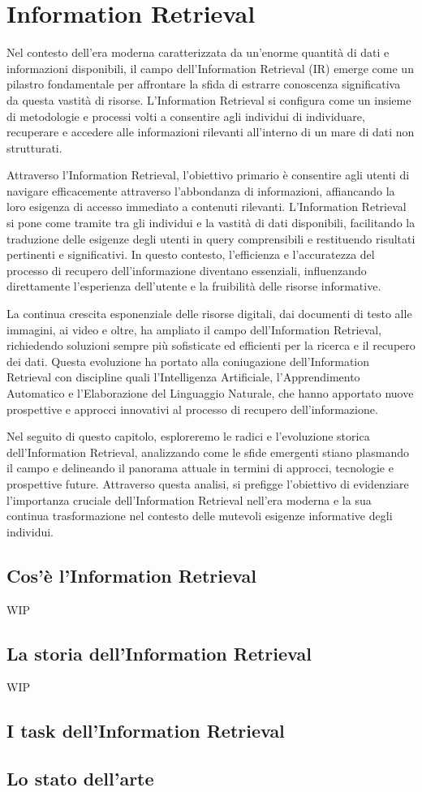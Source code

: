 \chapter{Information Retrieval}\label{Information_Retrieval}
Nel contesto dell'era moderna caratterizzata da un'enorme quantità di dati e informazioni disponibili, il campo dell'Information Retrieval (IR) emerge come un pilastro fondamentale per affrontare la sfida di estrarre conoscenza significativa da questa vastità di risorse. L'Information Retrieval si configura come un insieme di metodologie e processi volti a consentire agli individui di individuare, recuperare e accedere alle informazioni rilevanti all'interno di un mare di dati non strutturati.

Attraverso l'Information Retrieval, l'obiettivo primario è consentire agli utenti di navigare efficacemente attraverso l'abbondanza di informazioni, affiancando la loro esigenza di accesso immediato a contenuti rilevanti. L'Information Retrieval si pone come tramite tra gli individui e la vastità di dati disponibili, facilitando la traduzione delle esigenze degli utenti in query comprensibili e restituendo risultati pertinenti e significativi. In questo contesto, l'efficienza e l'accuratezza del processo di recupero dell'informazione diventano essenziali, influenzando direttamente l'esperienza dell'utente e la fruibilità delle risorse informative.

La continua crescita esponenziale delle risorse digitali, dai documenti di testo alle immagini, ai video e oltre, ha ampliato il campo dell'Information Retrieval, richiedendo soluzioni sempre più sofisticate ed efficienti per la ricerca e il recupero dei dati. Questa evoluzione ha portato alla coniugazione dell'Information Retrieval con discipline quali l'Intelligenza Artificiale, l'Apprendimento Automatico e l'Elaborazione del Linguaggio Naturale, che hanno apportato nuove prospettive e approcci innovativi al processo di recupero dell'informazione.

Nel seguito di questo capitolo, esploreremo le radici e l'evoluzione storica dell'Information Retrieval, analizzando come le sfide emergenti stiano plasmando il campo e delineando il panorama attuale in termini di approcci, tecnologie e prospettive future. Attraverso questa analisi, si prefigge l'obiettivo di evidenziare l'importanza cruciale dell'Information Retrieval nell'era moderna e la sua continua trasformazione nel contesto delle mutevoli esigenze informative degli individui.\section{Cos'è l'Information Retrieval} WIP

\section{La storia dell'Information Retrieval} WIP
 
\section{I task dell'Information Retrieval}

\section{Lo stato dell'arte}
